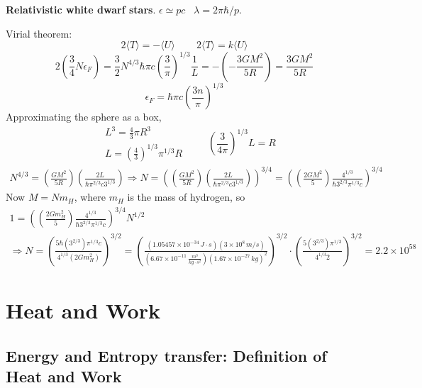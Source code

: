 \documentclass[twoside]{amsart}
\theoremstyle{plain}
\theoremstyle{definition}
\newcommand{\solutionhead}[1]
  {
   \noindent{\small\bf Solution #1.}
   }
\begin{document}
\solutionhead{10} \textbf{Relativistic white dwarf stars}.  
$\epsilon \simeq pc$  \quad \, $\lambda = 2\pi \hbar /p$.  

Virial theorem:
\[
2 \langle T \rangle = - \langle U \rangle \quad \quad \, 2 \langle T \rangle = k \langle U \rangle
\]
\[
2 \left( \frac{3}{4} N \epsilon_F \right) = \frac{3}{2} N^{4/3} \hbar \pi c \left( \frac{3}{\pi } \right)^{1/3} \frac{1}{L} = - \left( - \frac{ 3 GM^2}{ 5 R } \right) = \frac{ 3 GM^2 }{ 5 R }
\]
\[
\epsilon_F = \hbar \pi c \left( \frac{ 3 n}{ \pi } \right)^{1/3}
\]
Approximating the sphere as a box,
\[
\begin{aligned}
  & L^3 = \frac{4}{3} \pi R^3 \\ 
  & L = \left( \frac{ 4}{3} \right)^{1/3} \pi^{1/3} R
\end{aligned} \quad \quad \, \left( \frac{ 3}{ 4 \pi } \right)^{1/3} L = R
\]
\[
\begin{gathered}
N^{4/3} = \left( \frac{ GM^2}{ 5 R} \right)\left( \frac{ 2L}{ \hbar \pi^{2/3} c 3^{1/3}} \right) \Longrightarrow N = \left( \left( \frac{ GM^2}{ 5R} \right)\left( \frac{ 2 L }{ \hbar \pi^{2/3} c 3^{1/3}} \right) \right)^{3/4} = \left( \left( \frac {2 GM^2}{ 5 } \right) \frac{ 4^{1/3} }{ \hbar 3^{2/3} \pi^{1/3} c } \right)^{3/4}
\end{gathered}
\]
Now $M = Nm_H$, where $m_H$ is the mass of hydrogen, so
\[
\begin{gathered}
  1 = \left( \left( \frac{ 2 G m_H^2}{ 5} \right) \frac{ 4^{1/3} }{ \hbar 3^{2/3} \pi^{1/3} c } \right)^{3/4} N^{1/2} \\ 
  \Longrightarrow N = \left( \frac{ 5 \hbar (3^{2/3}) \pi^{1/3} c }{ 4^{1/3} (2Gm_H^2) } \right)^{3/2} = \left( \frac{ (1.05457 \times 10^{-34} \, J\cdot s )( 3\times 10^8 \, m/s) }{ (6.67 \times 10^{-11} \, \frac{m^3}{ kg\cdot s^2} ) ( 1.67 \times 10^{-27} \, kg)^2 } \right)^{3/2} \cdot \left( \frac{ 5 (3^{2/3}) \pi^{1/3} }{ 4^{1/3} 2 } \right)^{3/2} = 2.2 \times 10^{58}
\end{gathered}
\]



\section{Heat and Work}

\subsection*{Energy and Entropy transfer: Definition of Heat and Work}
\end{document}
